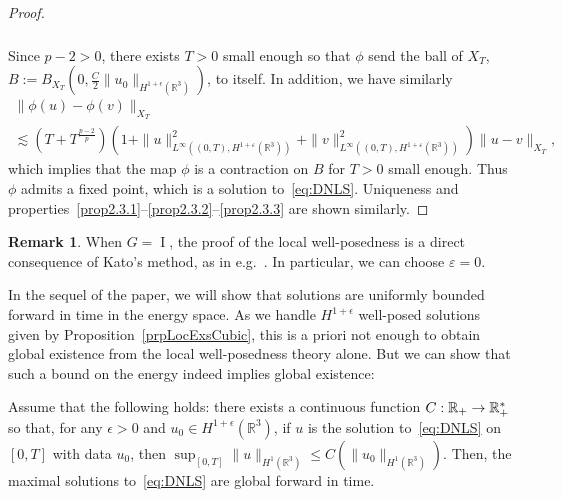 \documentclass[10pt]{amsart}
\theoremstyle{definition}\newtheorem{defi}[theo]{Definition}\newtheorem{rema}[theo]{Remark}\newtheorem{exam}[theo]{Example}\newtheorem{exem}[theo]{Example}\newtheorem{nota}[theo]{Notation}
\newcommand*\R{\mathbb{R}}
\newcommand*\eps{\varepsilon}
\DeclareMathOperator{\I}{I}
\renewcommand*{\to}{\mathchoice{\longrightarrow}{\rightarrow}{\rightarrow}{\rightarrow}}
\begin{document}
\begin{proof}
\begin{multline*}
\begin{aligned}
\end{aligned}
\end{multline*}
Since $p - 2 >0$, there exists $T>0$ small enough so that $\phi$ send the ball of $X_T$, $B:= B_{X_T}(0, \frac C2 \| u_0 \|_{H^{1+\epsilon}(\R ^3)})$, to itself. In addition, we have similarly
\begin{multline*}
\| \phi(u) - \phi(v) \|_{X_T}\\
\lesssim \left(T + T^{\frac{p - 2}{p}}\right) \left(1+\| u \|_{L^\infty\left((0,T),H^{1 + \eps}(\R^3)\right) }^{2}+ \| v \|_{L^\infty\left((0,T),H^{1 +\eps}(\R^3)\right) }^2\right)\| u -v \|_{X_T},
\end{multline*}
which implies that the map $\phi$ is a contraction on $B$ for $T>0$ small enough. Thus $\phi$ admits a fixed point, which is a solution to~\eqref{eq:DNLS}. Uniqueness and properties~\eqref{prop2.3.1}--\eqref{prop2.3.2}--\eqref{prop2.3.3} are shown similarly.
\end{proof}

\begin{rema}
When $G = \I$, the proof of the local well-posedness is a direct consequence of Kato's method, as in e.g.~\cite[Section~$4.4$]{Ca03}. In particular, we can choose $\eps = 0$.
\end{rema}

In the sequel of the paper, we will show that solutions are uniformly bounded forward in time in the energy space. As we handle $H^{1+\epsilon}$ well-posed solutions given by Proposition~\ref{prpLocExsCubic}, this is a priori not enough to obtain global existence from the local well-posedness theory alone. But we can show that such a bound on the energy indeed implies global existence:

\begin{prop}\label{prop:cond_glob}
Assume that the following holds: there exists a continuous function $C: \R_+ \to \R_+^*$ so that, for any $\epsilon >0$ and $u_0 \in H^{1+\epsilon}(\R^3)$, if $u$ is the solution to~\eqref{eq:DNLS} on $[0, T]$ with data $u_0$, then $\sup_{[0, T]}\| u \|_{H^1(\R^3)} \leq C(\| u_0 \|_{H^1(\R^3)})$. Then, the maximal solutions to~\eqref{eq:DNLS} are global forward in time.
\end{prop}
\end{document}
